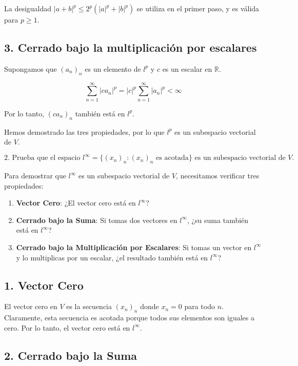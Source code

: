 \documentclass{article}
\begin{document}
La desigualdad \( |a+b|^p \leq 2^p(|a|^p + |b|^p) \) se utiliza en el primer paso, y es válida para \( p \geq 1 \).

\subsection*{3. Cerrado bajo la multiplicación por escalares}

Supongamos que \( (a_n)_n \) es un elemento de \( l^p \) y \( c \) es un escalar en \( \mathbb{R} \).

\[
\sum_{n=1}^\infty |c a_n|^p = |c|^p \sum_{n=1}^\infty |a_n|^p < \infty
\]

Por lo tanto, \( (c a_n)_n \) también está en \( l^p \).

Hemos demostrado las tres propiedades, por lo que \( l^p \) es un subespacio vectorial de \( V \).

\[
\boxed{\text{2. Prueba que el espacio } l^{\infty} = \{(x_n)_n : (x_n)_n \text{ es acotada}\} \text{ es un subespacio vectorial de } V.}
\]


Para demostrar que \( l^\infty \) es un subespacio vectorial de \( V \), necesitamos verificar tres propiedades:

\begin{enumerate}
    \item \textbf{Vector Cero}: ¿El vector cero está en \( l^\infty \)?
    \item \textbf{Cerrado bajo la Suma}: Si tomas dos vectores en \( l^\infty \), ¿su suma también está en \( l^\infty \)?
    \item \textbf{Cerrado bajo la Multiplicación por Escalares}: Si tomas un vector en \( l^\infty \) y lo multiplicas por un escalar, ¿el resultado también está en \( l^\infty \)?
\end{enumerate}

\subsection*{1. Vector Cero}

El vector cero en \( V \) es la secuencia \( (x_n)_n \) donde \( x_n = 0 \) para todo \( n \). Claramente, esta secuencia es acotada porque todos sus elementos son iguales a cero. Por lo tanto, el vector cero está en \( l^\infty \).

\subsection*{2. Cerrado bajo la Suma}
\end{document}
